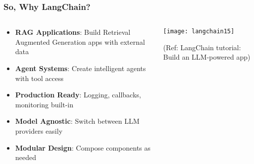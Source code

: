 \begin{frame}[fragile]\frametitle{So, Why LangChain?}

  \begin{columns}
    \begin{column}{0.5\textwidth}
      \begin{itemize}
        \item \textbf{RAG Applications}: Build Retrieval Augmented Generation apps with external data
        \item \textbf{Agent Systems}: Create intelligent agents with tool access
        \item \textbf{Production Ready}: Logging, callbacks, monitoring built-in
        \item \textbf{Model Agnostic}: Switch between LLM providers easily
        \item \textbf{Modular Design}: Compose components as needed
      \end{itemize}
    \end{column}
    \begin{column}{0.5\textwidth}
			\begin{center}
			\texttt{[image: langchain15]}
			\end{center}	  
			{\tiny (Ref: LangChain tutorial: Build an LLM-powered app)}
    \end{column}
  \end{columns}

\end{frame}


